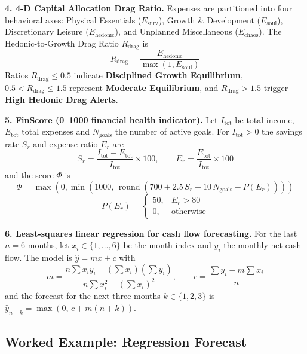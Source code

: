 \documentclass[12pt,a4paper]{report}
\begin{document}
\textbf{4. 4-D Capital Allocation Drag Ratio.}
Expenses are partitioned into four behavioral axes: Physical Essentials ($E_{\text{surv}}$), Growth \& Development ($E_{\text{soul}}$), Discretionary Leisure ($E_{\text{hedonic}}$), and Unplanned Miscellaneous ($E_{\text{chaos}}$). The Hedonic-to-Growth Drag Ratio $R_{\text{drag}}$ is
\begin{equation}
R_{\text{drag}} = \frac{E_{\text{hedonic}}}{\max(1, E_{\text{soul}})}
\end{equation}
Ratios $R_{\text{drag}} \le 0.5$ indicate \textbf{Disciplined Growth Equilibrium}, $0.5 < R_{\text{drag}} \le 1.5$ represent \textbf{Moderate Equilibrium}, and $R_{\text{drag}} > 1.5$ trigger \textbf{High Hedonic Drag Alerts}.

\textbf{5. FinScore (0--1000 financial health indicator).}
Let $I_{\text{tot}}$ be total income, $E_{\text{tot}}$ total expenses and $N_{\text{goals}}$ the number of active goals. For $I_{\text{tot}} > 0$ the savings rate $S_r$ and expense ratio $E_r$ are
\begin{equation}
S_r = \frac{I_{\text{tot}} - E_{\text{tot}}}{I_{\text{tot}}} \times 100, \qquad E_r = \frac{E_{\text{tot}}}{I_{\text{tot}}} \times 100
\end{equation}
and the score $\Phi$ is
\begin{equation}
\Phi = \max\left(0, \min\left(1000, \, \operatorname{round}\left(700 + 2.5\,S_r + 10\,N_{\text{goals}} - P(E_r)\right)\right)\right)
\end{equation}
\begin{equation}
P(E_r) = \begin{cases} 50, & E_r > 80 \\ 0, & \text{otherwise} \end{cases}
\end{equation}

\textbf{6. Least-squares linear regression for cash flow forecasting.}
For the last $n = 6$ months, let $x_i \in \{1,\dots,6\}$ be the month index and $y_i$ the monthly net cash flow. The model is $\hat{y} = mx + c$ with
\begin{equation}
m = \frac{n \sum x_i y_i - \left(\sum x_i\right)\left(\sum y_i\right)}{n \sum x_i^2 - \left(\sum x_i\right)^2}, \qquad
c = \frac{\sum y_i - m \sum x_i}{n}
\end{equation}
and the forecast for the next three months $k \in \{1,2,3\}$ is $\hat{y}_{n+k} = \max\left(0, \, c + m(n + k)\right)$.\cite{linear_regression}


\subsection{Worked Example: Regression Forecast}\label{s4221}
\end{document}
